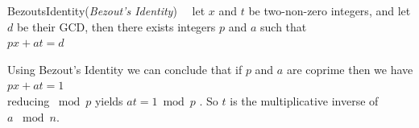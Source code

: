 \begin{prop}{BezoutsIdentity}(\emph{Bezout's Identity})~~ let $x$ and $t$ be two-non-zero integers, and let $d$ be their GCD, then there exists integers $p$ and $a$ such that\\
 \hspace*{\parindent} $px + at = d$
\end{prop}

\begin{corollary}
Using Bezout's Identity we can conclude that if $p$ and $a$ are coprime then we have\\
\hspace*{\parindent} $px + at = 1$ \\
reducing $\bmod p$ yields $at = 1 \bmod p$ .  So $t$ is the multiplicative inverse of\\
 $a$ $\bmod n$.
\end{corollary}

